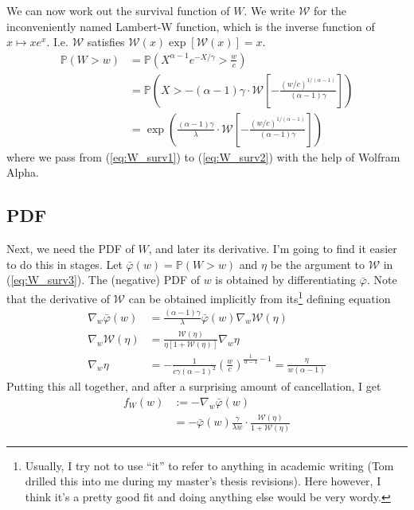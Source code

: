 \documentclass{article}
\newcommand{\bP}{\mathbb{P}}
\newcommand{\sW}{\mathscr{W}}
\begin{document}
We can now work out the survival function of $W$. We write $\sW$ for the inconveniently named Lambert-W function, which is the inverse function of $x \mapsto x e^x$. I.e. $\sW$ satisfies $\sW(x) \exp[\sW(x)] = x$.
%
\begin{align}
    \bP (W > w) &= \bP \left( X^{\alpha - 1} e^{-X/\gamma} > \frac{w}{c} \right) \label{eq:W_surv1}\\
    &= \bP \left( X > - (\alpha - 1) \gamma \cdot \sW \left[ - \frac{(w/c)^{1/(\alpha-1)}}{(\alpha - 1) \gamma} \right] \right) \label{eq:W_surv2}\\
    &= \exp \left( \frac{(\alpha - 1) \gamma}{\lambda} \cdot \sW \left[ - \frac{(w/c)^{1/(\alpha-1)}}{(\alpha - 1) \gamma} \right] \right) \label{eq:W_surv3}
\end{align}
%
where we pass from (\ref{eq:W_surv1}) to (\ref{eq:W_surv2}) with the help of Wolfram Alpha.

\subsection{PDF}
\label{sec:pdf}

Next, we need the PDF of $W$, and later its derivative. I'm going to find it easier to do this in stages. Let $\bar{\varphi}(w) = \bP(W > w)$ and $\eta$ be the argument to $\sW$ in (\ref{eq:W_surv3}). The (negative) PDF of $w$ is obtained by differentiating $\bar{\varphi}$. Note that the derivative of $\sW$ can be obtained implicitly from its\footnote{Usually, I try not to use ``it'' to refer to anything in academic writing (Tom drilled this into me during my master's thesis revisions). Here however, I think it's a pretty good fit and doing anything else would be very wordy.} defining equation
%
\begin{align}
    \nabla_w \bar{\varphi}(w) &=  \frac{(\alpha - 1) \gamma}{\lambda} \bar{\varphi}(w) \nabla_w \sW (\eta)\\
    \nabla_w \sW(\eta) &= \frac{\sW(\eta)}{\eta [ 1 + \sW(\eta)]} \nabla_w \eta\\
    \nabla_w \eta &= - \frac{1}{c \gamma (\alpha - 1)^2} \left( \frac{w}{c} \right)^{\frac{1}{\alpha - 1} - 1} = \frac{\eta}{w(\alpha - 1)} \label{eq:nabla_eta}
\end{align}
%
Putting this all together, and after a surprising amount of cancellation, I get
%
\begin{align}
    f_W(w) &:= -\nabla_w \bar{\varphi}(w)\\
    &= - \bar{\varphi}(w) \frac{\gamma}{\lambda w} \cdot \frac{\sW(\eta)}{1 + \sW(\eta)}
\end{align}
\end{document}
